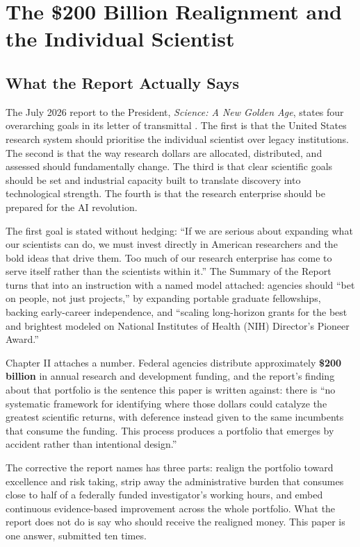\section{The \$200 Billion Realignment and the Individual Scientist}

\subsection{What the Report Actually Says}

The July 2026 report to the President, \textit{Science: A New Golden Age},
states four overarching goals in its letter of transmittal
\cite{kratsios2026sciencegoldenage}. The first is that the United States
research system should prioritise the individual scientist over legacy
institutions. The second is that the way research dollars are allocated,
distributed, and assessed should fundamentally change. The third is that clear
scientific goals should be set and industrial capacity built to translate
discovery into technological strength. The fourth is that the research
enterprise should be prepared for the AI revolution.

The first goal is stated without hedging: ``If we are serious about expanding
what our scientists can do, we must invest directly in American researchers and
the bold ideas that drive them. Too much of our research enterprise has come to
serve itself rather than the scientists within it.'' The Summary of the Report
turns that into an instruction with a named model attached: agencies should
``bet on people, not just projects,'' by expanding portable graduate
fellowships, backing early-career independence, and ``scaling long-horizon
grants for the best and brightest modeled on National Institutes of Health (NIH)
Director's Pioneer Award.''

Chapter II attaches a number. Federal agencies distribute approximately
\textbf{\$200 billion} in annual research and development funding, and the
report's finding about that portfolio is the sentence this paper is written
against: there is ``no systematic framework for identifying where those dollars
could catalyze the greatest scientific returns, with deference instead given to
the same incumbents that consume the funding. This process produces a portfolio
that emerges by accident rather than intentional design.''

The corrective the report names has three parts: realign the portfolio toward
excellence and risk taking, strip away the administrative burden that consumes
close to half of a federally funded investigator's working hours, and embed
continuous evidence-based improvement across the whole portfolio. What the
report does not do is say who should receive the realigned money. This paper is
one answer, submitted ten times.

